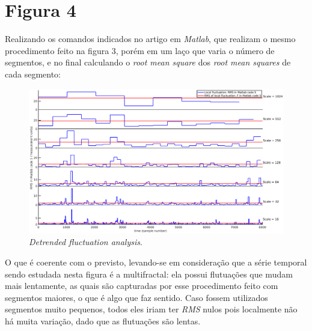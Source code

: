 \documentclass{article}[twocolumn]
\begin{document}
	\section{Figura 4}
	Realizando os comandos indicados no artigo em \textit{Matlab}, que realizam o mesmo procedimento
	feito na figura 3, por\'em em um la\c{c}o que varia o n\'umero de segmentos, e no final
	calculando o \textit{root mean square} dos \textit{root mean squares} de cada segmento:
	\begin{figure}[H]
		\centering
		\includegraphics[width=12cm]{fig4.eps}
		\caption{\textit{Detrended fluctuation analysis}.}
	\end{figure}
	O que \'e coerente com o previsto, levando-se em considera\c{c}\~ao que a s\'erie
	temporal sendo estudada nesta figura \'e a multifractal: ela possui flutua\c{c}\~oes
	que mudam mais lentamente, as quais s\~ao capturadas por esse procedimento feito com
	segmentos maiores, o que \'e algo que faz sentido. Caso fossem utilizados segmentos muito
	pequenos, todos eles iriam ter \textit{RMS} nulos pois localmente n\~ao h\'a muita
	varia\c{c}\~ao, dado que as flutua\c{c}\~oes s\~ao lentas.
\end{document}
